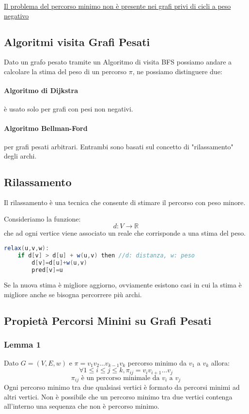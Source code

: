\underline{Il problema del percorso minimo non è presente nei grafi privi di cicli a peso negativo}

\subsection{Algoritmi visita Grafi Pesati}
Dato un grafo pesato tramite un Algoritmo di visita BFS possiamo andare a calcolare la stima del peso di un percorso $\pi$, ne possiamo distinguere due:
\paragraph{Algoritmo di Dijkstra} è usato solo per grafi con pesi non negativi.
\paragraph{Algoritmo Bellman-Ford} per grafi pesati arbitrari.
Entrambi sono basati sul concetto di "rilassamento" degli archi.

\subsection{Rilassamento}
Il rilassamento è una tecnica che consente di stimare il percorso con peso minore.\smallskip

Consideriamo la funzione:
$$ d: V \rightarrow \mathbb{R} $$
che ad ogni vertice viene associato un reale che corrisponde a una stima del peso.
\begin{lstlisting}[language=Java]
relax(u,v,w):
    if d[v] > d[u] + w(u,v) then //d: distanza, w: peso
        d[v]=d[u]+w(u,v)
        pred[v]=u
\end{lstlisting}
Se la nuova stima è migliore aggiorno, ovviamente esistono casi in cui la stima è migliore anche se bisogna percorrere più archi.

\subsection{Propietà Percorsi Minini su Grafi Pesati}
\subsubsection{Lemma 1}
Dato $G=(V,E,w)$ e $\pi=v_1v_2...v_{k-1}v_k$ percorso minimo da $v_1$ a $v_k$ allora:
$$ \forall 1 \le i \le j \le k, \pi_{ij}=v_iv_{i+1}...v_j$$
$$ \pi_{ij} \text{ è un percorso minimale da } v_i \text{ a } v_j$$
Ogni percorso minimo tra due qualsiasi vertici  è formato da percorsi minimi ad altri vertici. Non è possibile che un percorso minimo tra due vertici contenga all'interno una sequenza che non è percorso minimo.

